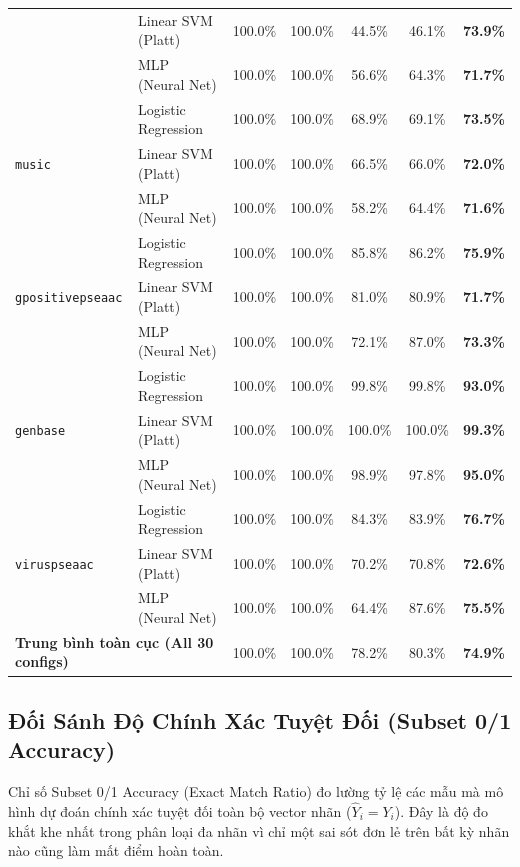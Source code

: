 \documentclass[10pt,a4paper,twoside]{article}
\begin{document}
\begin{table}[H]
{\begin{tabular}{llccccc}
 & Linear SVM (Platt) & 100.0\% & 100.0\% & 44.5\% & 46.1\% & \textbf{73.9\%} \\
 & MLP (Neural Net) & 100.0\% & 100.0\% & 56.6\% & 64.3\% & \textbf{71.7\%} \\
\midrule
\multirow{3}{*}{\texttt{music}} & Logistic Regression & 100.0\% & 100.0\% & 68.9\% & 69.1\% & \textbf{73.5\%} \\
 & Linear SVM (Platt) & 100.0\% & 100.0\% & 66.5\% & 66.0\% & \textbf{72.0\%} \\
 & MLP (Neural Net) & 100.0\% & 100.0\% & 58.2\% & 64.4\% & \textbf{71.6\%} \\
\midrule
\multirow{3}{*}{\texttt{gpositivepseaac}} & Logistic Regression & 100.0\% & 100.0\% & 85.8\% & 86.2\% & \textbf{75.9\%} \\
 & Linear SVM (Platt) & 100.0\% & 100.0\% & 81.0\% & 80.9\% & \textbf{71.7\%} \\
 & MLP (Neural Net) & 100.0\% & 100.0\% & 72.1\% & 87.0\% & \textbf{73.3\%} \\
\midrule
\multirow{3}{*}{\texttt{genbase}} & Logistic Regression & 100.0\% & 100.0\% & 99.8\% & 99.8\% & \textbf{93.0\%} \\
 & Linear SVM (Platt) & 100.0\% & 100.0\% & 100.0\% & 100.0\% & \textbf{99.3\%} \\
 & MLP (Neural Net) & 100.0\% & 100.0\% & 98.9\% & 97.8\% & \textbf{95.0\%} \\
\midrule
\multirow{3}{*}{\texttt{viruspseaac}} & Logistic Regression & 100.0\% & 100.0\% & 84.3\% & 83.9\% & \textbf{76.7\%} \\
 & Linear SVM (Platt) & 100.0\% & 100.0\% & 70.2\% & 70.8\% & \textbf{72.6\%} \\
 & MLP (Neural Net) & 100.0\% & 100.0\% & 64.4\% & 87.6\% & \textbf{75.5\%} \\
\midrule
\multicolumn{2}{l}{\textbf{Trung bình toàn cục (All 30 configs)}} & 100.0\% & 100.0\% & 78.2\% & 80.3\% & \textbf{74.9\%} \\
\bottomrule
\end{tabular}%
}
\end{table}

\clearpage
\subsection{Đối Sánh Độ Chính Xác Tuyệt Đối (Subset 0/1 Accuracy)}
Chỉ số Subset 0/1 Accuracy (Exact Match Ratio) đo lường tỷ lệ các mẫu mà mô hình dự đoán chính xác tuyệt đối toàn bộ vector nhãn ($\hat{Y}_i = Y_i$). Đây là độ đo khắt khe nhất trong phân loại đa nhãn vì chỉ một sai sót đơn lẻ trên bất kỳ nhãn nào cũng làm mất điểm hoàn toàn.
\end{document}
